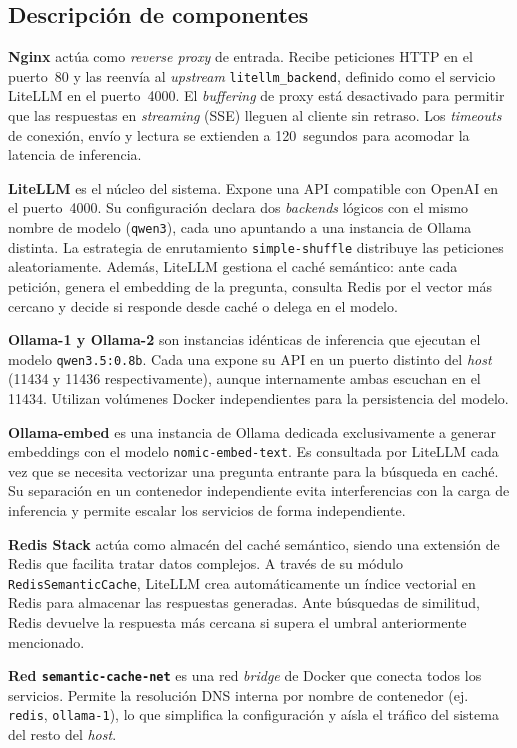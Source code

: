 \subsection{Descripción de componentes}

\textbf{Nginx} actúa como \textit{reverse proxy} de entrada. Recibe peticiones HTTP en el puerto~80 y las reenvía al \textit{upstream} \texttt{litellm\_backend}, definido como el servicio LiteLLM en el puerto~4000. El \textit{buffering} de proxy está desactivado para permitir que las respuestas en \textit{streaming} (SSE) lleguen al cliente sin retraso. Los \textit{timeouts} de conexión, envío y lectura se extienden a 120~segundos para acomodar la latencia de inferencia.

\textbf{LiteLLM} es el núcleo del sistema. Expone una API compatible con OpenAI en el puerto~4000. Su configuración declara dos \textit{backends} lógicos con el mismo nombre de modelo (\texttt{qwen3}), cada uno apuntando a una instancia de Ollama distinta. La estrategia de enrutamiento \texttt{simple-shuffle} distribuye las peticiones aleatoriamente. Además, LiteLLM gestiona el caché semántico: ante cada petición, genera el embedding de la pregunta, consulta Redis por el vector más cercano y decide si responde desde caché o delega en el modelo.

\textbf{Ollama-1 y Ollama-2} son instancias idénticas de inferencia que ejecutan el modelo \texttt{qwen3.5:0.8b}. Cada una expone su API en un puerto distinto del \textit{host} (11434 y 11436 respectivamente), aunque internamente ambas escuchan en el 11434. Utilizan volúmenes Docker independientes para la persistencia del modelo.

\textbf{Ollama-embed} es una instancia de Ollama dedicada exclusivamente a generar embeddings con el modelo \texttt{nomic-embed-text}. Es consultada por LiteLLM cada vez que se necesita vectorizar una pregunta entrante para la búsqueda en caché. Su separación en un contenedor independiente evita interferencias con la carga de inferencia y permite escalar los servicios de forma independiente.

\textbf{Redis Stack} actúa como almacén del caché semántico, siendo una extensión de Redis que facilita tratar datos complejos. A través de su módulo \texttt{RedisSemanticCache}, LiteLLM crea automáticamente un índice vectorial en Redis para almacenar las respuestas generadas. Ante búsquedas de similitud, Redis devuelve la respuesta más cercana si supera el umbral anteriormente mencionado.

\textbf{Red \texttt{semantic-cache-net}} es una red \textit{bridge} de Docker que conecta todos los servicios. Permite la resolución DNS interna por nombre de contenedor (ej. \texttt{redis}, \texttt{ollama-1}), lo que simplifica la configuración y aísla el tráfico del sistema del resto del \textit{host}.


